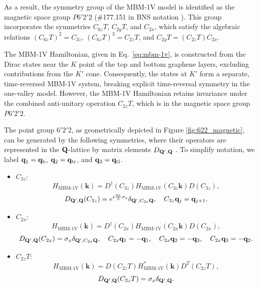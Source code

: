 As a result, the symmetry group of the MBM-1V model is identified as the magnetic space group \( P6'2'2 \) (\#177.151 in BNS notation \cite{bilbao_1}). This group incorporates the symmetries \( C_{6z}T \), \( C_{2y}T \), and \( C_{2x} \), which satisfy the algebraic relations \( (C_{6z}T)^2 = C_{3z} \), \( (C_{6z}T)^3 = C_{2z}T \), and $C_{2y} T = (C_{2z}T) C_{2x}$.

The MBM-1V Hamiltonian, given in Eq.~\eqref{eq:mbm-1v}, is constructed from the Dirac states near the \( K \) point of the top and bottom graphene layers, excluding contributions from the \( K' \) cone. Consequently, the states at \( K' \) form a separate, time-reversed MBM-1V system, breaking explicit time-reversal symmetry in the one-valley model. However, the MBM-1V Hamiltonian retains invariance under the combined anti-unitary operation \( C_{2z}T \), which is in the magnetic space group \( P6'2'2 \).

The point group \( 6'2'2 \), as geometrically depicted in Figure \ref{fig:622_magnetic}, can be generated by the following symmetries, where their operators are represented in the \( {\vb{Q}} \)-lattice by matrix elements \( D_{{\vb{Q}}',{\vb{Q}}} \) \cite{all_magic_angles}. To simplify notation, we label ${\vb{q}}_1 = {\vb{q}}_{\text{b}}$, ${\vb{q}}_2 = {\vb{q}}_{\text{tr}}$, and ${\vb{q}}_3 = {\vb{q}}_{\text{tl}}$.
\begin{itemize}
\item \( C_{3z} \):
\begin{equation} \label{eq:C3z_Qlattice_mbm1v}
H_{\text{MBM-1V}}(\mathbf{k}) = D^\dagger(C_{3z}) H_{\text{MBM-1V}}(C_{3z}\mathbf{k}) D(C_{3z}),
\end{equation}
\begin{equation}
D_{{\vb{Q}}',{\vb{Q}}}(C_{3z}) = e^{i\frac{2\pi}{3}\sigma_z} \delta_{{\vb{Q}}',C_{3z}{\vb{Q}}}, \quad C_{3z}{\vb{q}}_j = {\vb{q}}_{j+1}.
\end{equation}

\item \( C_{2x} \):
\begin{equation} \label{eq:C2x_Qlattice_mbm1v}
H_{\text{MBM-1V}}(\mathbf{k}) = D^\dagger(C_{2x}) H_{\text{MBM-1V}}(C_{2x}\mathbf{k}) D(C_{2x}),
\end{equation}
\begin{equation}
D_{{\vb{Q}}',{\vb{Q}}}(C_{2x}) = \sigma_x \delta_{{\vb{Q}}',C_{2x}{\vb{Q}}}, \quad C_{2x}{\vb{q}}_1 = -{\vb{q}}_1, \quad C_{2x}{\vb{q}}_2 = -{\vb{q}}_3, \quad C_{2x}{\vb{q}}_3 = -{\vb{q}}_2.
\end{equation}

\item \( C_{2z}T \):
\begin{equation} \label{eq:C2zT_Qlattice_mbm1v}
H_{\text{MBM-1V}}(\mathbf{k}) = D(C_{2z}T) H_{\text{MBM-1V}}^*(\mathbf{k}) D^T(C_{2z}T),
\end{equation}
\begin{equation}
D_{{\vb{Q}}',{\vb{Q}}}(C_{2z}T) = \sigma_x \delta_{{\vb{Q}}',{\vb{Q}}}.
\end{equation}
\end{itemize}

